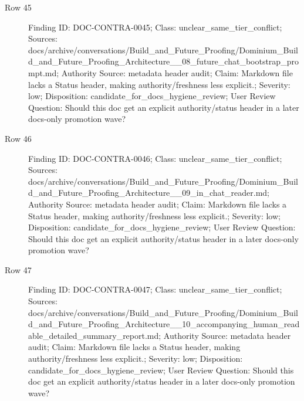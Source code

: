 \documentclass[10.5pt,a4paper,openany]{book}
\begin{document}
\begin{description}
\item[Row 45] Finding ID: DOC-\allowbreak{}CONTRA-\allowbreak{}0045; Class: unclear\_\allowbreak{}same\_\allowbreak{}tier\_\allowbreak{}conflict; Sources: docs/\allowbreak{}archive/\allowbreak{}conversations/\allowbreak{}Build\_\allowbreak{}and\_\allowbreak{}Future\_\allowbreak{}Proofing/\allowbreak{}Dominium\_\allowbreak{}Build\_\allowbreak{}and\_\allowbreak{}Future\_\allowbreak{}Proofing\_\allowbreak{}Architecture\_\allowbreak{}\_\allowbreak{}08\_\allowbreak{}future\_\allowbreak{}chat\_\allowbreak{}bootstrap\_\allowbreak{}prompt.\allowbreak{}md; Authority Source: metadata header audit; Claim: Markdown file lacks a Status header, making authority/\allowbreak{}freshness less explicit.\allowbreak{}; Severity: low; Disposition: candidate\_\allowbreak{}for\_\allowbreak{}docs\_\allowbreak{}hygiene\_\allowbreak{}review; User Review Question: Should this doc get an explicit authority/\allowbreak{}status header in a later docs-\allowbreak{}only promotion wave?
\item[Row 46] Finding ID: DOC-\allowbreak{}CONTRA-\allowbreak{}0046; Class: unclear\_\allowbreak{}same\_\allowbreak{}tier\_\allowbreak{}conflict; Sources: docs/\allowbreak{}archive/\allowbreak{}conversations/\allowbreak{}Build\_\allowbreak{}and\_\allowbreak{}Future\_\allowbreak{}Proofing/\allowbreak{}Dominium\_\allowbreak{}Build\_\allowbreak{}and\_\allowbreak{}Future\_\allowbreak{}Proofing\_\allowbreak{}Architecture\_\allowbreak{}\_\allowbreak{}09\_\allowbreak{}in\_\allowbreak{}chat\_\allowbreak{}reader.\allowbreak{}md; Authority Source: metadata header audit; Claim: Markdown file lacks a Status header, making authority/\allowbreak{}freshness less explicit.\allowbreak{}; Severity: low; Disposition: candidate\_\allowbreak{}for\_\allowbreak{}docs\_\allowbreak{}hygiene\_\allowbreak{}review; User Review Question: Should this doc get an explicit authority/\allowbreak{}status header in a later docs-\allowbreak{}only promotion wave?
\item[Row 47] Finding ID: DOC-\allowbreak{}CONTRA-\allowbreak{}0047; Class: unclear\_\allowbreak{}same\_\allowbreak{}tier\_\allowbreak{}conflict; Sources: docs/\allowbreak{}archive/\allowbreak{}conversations/\allowbreak{}Build\_\allowbreak{}and\_\allowbreak{}Future\_\allowbreak{}Proofing/\allowbreak{}Dominium\_\allowbreak{}Build\_\allowbreak{}and\_\allowbreak{}Future\_\allowbreak{}Proofing\_\allowbreak{}Architecture\_\allowbreak{}\_\allowbreak{}10\_\allowbreak{}accompanying\_\allowbreak{}human\_\allowbreak{}readable\_\allowbreak{}detailed\_\allowbreak{}summary\_\allowbreak{}report.\allowbreak{}md; Authority Source: metadata header audit; Claim: Markdown file lacks a Status header, making authority/\allowbreak{}freshness less explicit.\allowbreak{}; Severity: low; Disposition: candidate\_\allowbreak{}for\_\allowbreak{}docs\_\allowbreak{}hygiene\_\allowbreak{}review; User Review Question: Should this doc get an explicit authority/\allowbreak{}status header in a later docs-\allowbreak{}only promotion wave?

\end{description}
\end{document}
